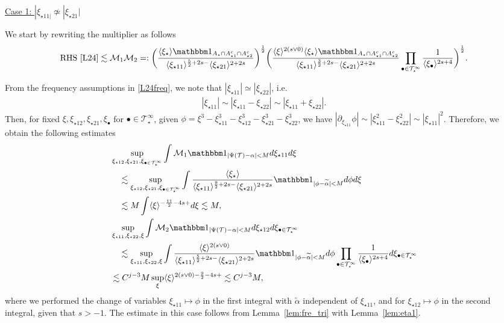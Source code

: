\documentclass[%
11pt,  reqno]{amsart}
\newcommand{\5}{\textup{V}}
\newcommand{\noi}{\noindent}
\newcommand{\ind}{\mathbbm 1}
\newcommand{\les}{\lesssim}
\newcommand{\wt}{\widetilde}
\theoremstyle{remark}
\newcommand{\bul}{\bullet}
\newcommand{\TT}{\mathcal{T}}
\newcommand{\al}{\alpha}
\newcommand{\jb}[1]
{\langle #1 \rangle}
\newcommand{\M}{\mathcal{M}}
\numberwithin{equation}{section}
\numberwithin{theorem}{section}
\begin{document}
\smallskip
\noi
\underline{Case 1: $|\xi_{\star11|} \not\simeq |\xi_{\star21}|$}

We start by rewriting the multiplier as follows
\begin{align}
\text{RHS \eqref{L24}}
\les 
\M_1 \M_2
=: \bigg( \frac{\jb{\xi_\star}
\ind_{A_\star \cap A^c_{\star1} \cap A^c_{\star2}}
}{\jb{\xi_{\star11}}^{\frac52+2s-} \jb{\xi_{\star21}}^{2+2s}}  \bigg)^\frac12 
\bigg(
\frac{
\jb{\xi}^{2(s\lor0)}
\jb{\xi_\star}
\ind_{A_\star \cap A^c_{\star1} \cap A^c_{\star2}}
}{
\jb{\xi_{\star11}}^{\frac32+2s-}
\jb{\xi_{\star21}}^{2+2s}
}
\prod_{\bul\in \TT^\infty_\star} \frac{1}{\jb{\xi_\bul}^{2s+4}}
\bigg)^\frac12.
\end{align}

\noi
From the frequency assumptions in \eqref{L24freq}, we note that $|\xi_{\star11}| \simeq |\xi_{\star22}|$, i.e.
\begin{align}
|\xi_{\star11}| \sim |\xi_{\star11} - \xi_{\star22}| \sim |\xi_{\star11} + \xi_{\star22}|.  
\end{align}
Then, for fixed $\xi, \xi_{\star12}, \xi_{\star21}, \xi_\bul$ for $\bul\in \TT^\infty_\star$, given $\phi = \xi^3 - \xi_{\star11}^3 - \xi_{\star12}^3 - \xi_{\star21}^3 - \xi_{\star22}^3$, we have $|\partial_{\xi_{\star11}} \phi | \sim  |\xi_{\star11}^2 - \xi_{\star22}^2| \sim |\xi_{\star11}|^2$. Therefore, we obtain the following estimates
\begin{align}
& 
\sup_{\xi_{\star12}, \xi_{\star21}, \xi_{\bul\in \TT^\infty_\star}}
\int \M_1 \ind_{|\Psi(\TT) - \al| < M } d\xi_{\star11} d\xi 
\\
&
\quad 
\les 
\sup_{\xi_{\star12}, \xi_{\star21}, \xi_{\bul\in \TT^\infty_\star}}
\int 
\frac{\jb{\xi_\star} }{ \jb{\xi_{\star11}}^{\frac92 + 2s-} \jb{\xi_{\star21}}^{2+2s} } \ind_{|\phi - \wt\al| < M } d\phi d\xi 
\\
&
\quad 
\les M \int \jb{\xi}^{-\frac{11}{2} - 4s + } d\xi \les M, 
\\
&
\sup_{\xi_{\star11}, \xi_{\star22}, \xi} 
\int \M_2  \ind_{|\Psi(\TT) - \al| < M} 
d \xi_{\star12} 
d\xi_{\bul \in \TT^\infty_\star}
\\
&
\quad 
\les 
\sup_{\xi_{\star11}, \xi_{\star22}, \xi} 
\int 
\frac{ \jb{\xi}^{2(s\lor0)}  }{ \jb{\xi_{\star11}}^{\frac52 + 2s -} \jb{\xi_{\star21}}^{2+2s} } \ind_{|\phi - \wt\al| < M} d\phi 
\prod_{\bul\in \TT^\infty_\star} \frac{1}{\jb{\xi_\bul}^{2s+4}}
d\xi_{\bul \in \TT^\infty_\star}
\\
&
\les C^{j-3} M  \sup_\xi \jb{\xi}^{2(s\lor 0) - \frac92 - 4s + } \les C^{j-3} M 
, 
\end{align}
where we performed the change of variables $\xi_{\star11} \mapsto \phi$ in the first integral with $\wt\al$ independent of $\xi_{\star11}$, 
and for $\xi_{\star12} \mapsto \phi$ in the second integral, 
given that $s>-1$. 
The estimate in this case follows from Lemma~\ref{lem:fre_tri} with Lemma~\ref{lem:eta1}. 
\end{document}
